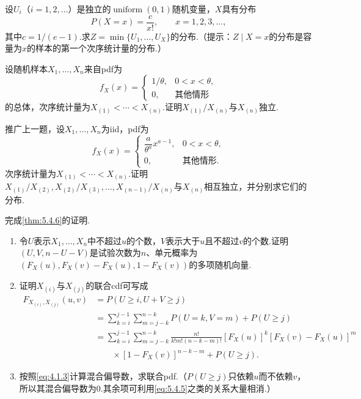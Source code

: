 \begin{exercise}\label{exercise:5.23}
设$U_i$（$i=1,2,\ldots$）是独立的$\operatorname{uniform}(0,1)$随机变量，$X$具有分布
$$P(X=x)=\frac c{x!},\qquad x=1,2,3,\ldots,$$
其中$c=1/(e-1)$.求$Z=\min\{U_1,\ldots,U_X\}$的分布.（提示：$Z\mid X=x$的分布是容量为$x$的样本的第一个次序统计量的分布.）
\end{exercise}
\begin{exercise}\label{exercise:5.24}
设随机样本$X_1,\ldots,X_n$来自pdf为
$$f_X(x)=\begin{cases}1/\theta,&0<x<\theta,\\0,&\text{其他情形}\end{cases}$$
的总体，次序统计量为$X_{(1)}<\cdots<X_{(n)}$.证明$X_{(1)}/X_{(n)}$与$X_{(n)}$独立.
\end{exercise}
\begin{exercise}\label{exercise:5.25}
推广上一题，设$X_1,\ldots,X_n$为iid，pdf为
$$f_X(x)=\begin{cases}\dfrac a{\theta^a}x^{a-1},&0<x<\theta,\\0,&\text{其他情形}.\end{cases}$$
次序统计量为$X_{(1)}<\cdots<X_{(n)}$.证明$X_{(1)}/X_{(2)},X_{(2)}/X_{(3)},\ldots,X_{(n-1)}/X_{(n)}$与$X_{(n)}$相互独立，并分别求它们的分布.
\end{exercise}
\begin{exercise}\label{exercise:5.26}
完成\autoref{thm:5.4.6}的证明.
\begin{enumerate}[label=(\alph*)]
\item 令$U$表示$X_1,\ldots,X_n$中不超过$u$的个数，$V$表示大于$u$且不超过$v$的个数.证明$(U,V,n-U-V)$是试验次数为$n$、单元概率为$(F_X(u),F_X(v)-F_X(u),1-F_X(v))$的多项随机向量.
\item 证明$X_{(i)}$与$X_{(j)}$的联合cdf可写成
\begin{align*}
F_{X_{(i)},X_{(j)}}(u,v)&=P(U\ge i,U+V\ge j)\\
&=\sum_{k=i}^{j-1}\sum_{m=j-k}^{n-k}P(U=k,V=m)+P(U\ge j)\\
&=\sum_{k=i}^{j-1}\sum_{m=j-k}^{n-k}\frac{n!}{k!m!(n-k-m)!}[F_X(u)]^k[F_X(v)-F_X(u)]^m\\
&\qquad\times[1-F_X(v)]^{n-k-m}+P(U\ge j).
\end{align*}
\item 按照\eqref{eq:4.1.3}计算混合偏导数，求联合pdf.（$P(U\ge j)$只依赖$u$而不依赖$v$，所以其混合偏导数为0.其余项可利用\eqref{eq:5.4.5}之类的关系大量相消.）
\end{enumerate}
\end{exercise}
